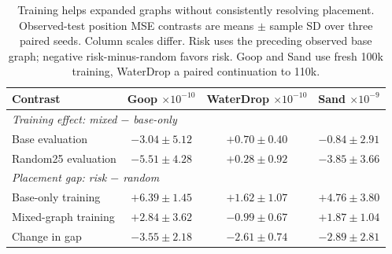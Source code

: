 \begin{table}[t]
\centering\scriptsize
\caption{Training helps expanded graphs without consistently resolving placement. Observed-test position MSE contrasts are means $\pm$ sample SD over three paired seeds. Column scales differ. Risk uses the preceding observed base graph; negative risk-minus-random favors risk. Goop and Sand use fresh 100k training, WaterDrop a paired continuation to 110k.}
\label{tab:goop-exposure-placement}
\setlength{\tabcolsep}{2.5pt}
\renewcommand{\arraystretch}{1.1}
\begin{tabular}{lccc}
\toprule
Contrast & \shortstack{Goop\\$\times10^{-10}$} & \shortstack{WaterDrop\\$\times10^{-10}$} & \shortstack{Sand\\$\times10^{-9}$}\\
\midrule
\multicolumn{4}{l}{\textit{Training effect: mixed $-$ base-only}}\\
Base evaluation & $-3.04\pm5.12$ & $+0.70\pm0.40$ & $-0.84\pm2.91$\\
Random25 evaluation & $-5.51\pm4.28$ & $+0.28\pm0.92$ & $-3.85\pm3.66$\\
\midrule
\multicolumn{4}{l}{\textit{Placement gap: risk $-$ random}}\\
Base-only training & $+6.39\pm1.45$ & $+1.62\pm1.07$ & $+4.76\pm3.80$\\
Mixed-graph training & $+2.84\pm3.62$ & $-0.99\pm0.67$ & $+1.87\pm1.04$\\
Change in gap & $-3.55\pm2.18$ & $-2.61\pm0.74$ & $-2.89\pm2.81$\\
\bottomrule
\end{tabular}
\end{table}
